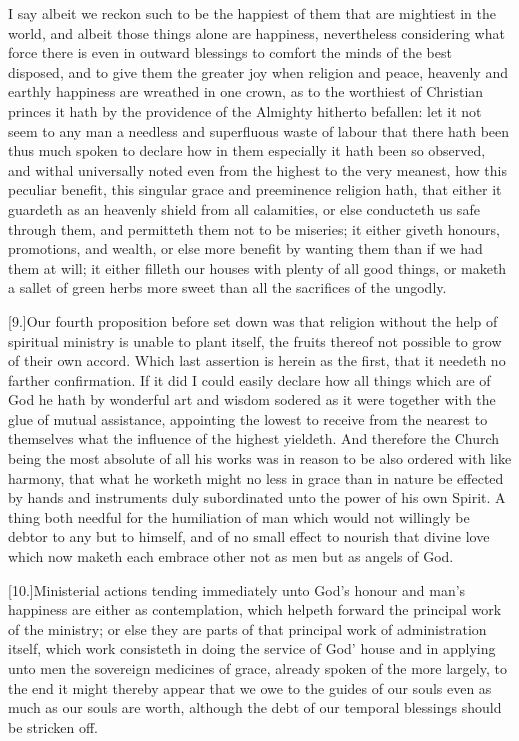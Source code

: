  I say albeit we reckon such to be the happiest of them that are mightiest in the world, and albeit those things alone are happiness, nevertheless considering what force there is even in outward blessings to comfort the minds of the best disposed, and to give them the greater joy when religion and peace, heavenly and earthly happiness are wreathed in one crown, as to the worthiest of Christian princes it hath by the providence of the Almighty hitherto befallen: let it not seem to any man a needless and superfluous waste of labour that there hath been thus much spoken to declare how in them especially it hath been so observed, and withal universally noted even from the highest to the very meanest, how this peculiar benefit, this singular grace and preeminence religion hath, that either it guardeth as an heavenly shield from all calamities, or else conducteth us safe through them, and permitteth them not to be miseries; it either giveth honours, promotions, and wealth, or else more benefit by wanting them than if we had them at will; it either filleth our houses with plenty of all good things, or maketh a sallet of green herbs more sweet than all the sacrifices of the ungodly.

[9.]Our fourth proposition before set down was that religion without the help of spiritual ministry is unable to plant itself, the fruits thereof not possible to grow of their own accord. Which last assertion is herein as the first, that it needeth no farther confirmation. If it did I could easily declare how all things which are of God he hath by wonderful art and wisdom sodered as it were together with the glue of mutual assistance, appointing the lowest to receive from the nearest to themselves what the influence of the highest yieldeth. And therefore the Church being the most absolute of all his works was in reason to be also ordered with like harmony, that what he worketh might no less in grace than in nature be effected by hands and instruments duly subordinated unto the power of his own Spirit. A thing both needful for the humiliation of man which would not willingly be debtor to any but to himself, and of no small effect to nourish that divine love which now maketh each embrace other not as men but as angels of God.




[10.]Ministerial actions tending immediately unto God’s honour and man’s happiness are either as contemplation, which helpeth forward the principal work of the ministry; or else they are parts of that principal work of administration itself, which work consisteth in doing the service of God’ house and in applying unto men the sovereign medicines of grace, already spoken of the more largely, to the end it might thereby appear that we owe to the guides of our souls even as much as our souls are worth, although the debt of our temporal blessings should be stricken off.


